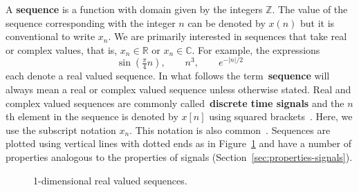 \documentclass[11pt,a4paper]{book}
\theoremstyle{plain}
\numberwithin{equation}{section}
\newcommand{\reals}{{\mathbb R}}
\newcommand{\ints}{{\mathbb Z}}
\newcommand{\complex}{{\mathbb C}}
\newcommand{\term}{\textbf}
\newcommand{\sabs}[1]{\vert #1 \vert}
\begin{document}
A \term{sequence} is a function with domain given by the integers $\ints$.  The value of the sequence corresponding with the integer $n$ can be denoted by $x(n)$ but it is conventional to write $x_n$.  We are primarily interested in sequences that take real or complex values, that is, $x_n \in \reals$ or $x_n \in \complex$.  For example,  the expressions
\[
\sin( \tfrac{\pi}{4} n), \qquad n^3, \qquad e^{-\sabs{n}/2}
\]
each denote a real valued sequence.  In what follows the term~\term{sequence} will always mean a real or complex valued sequence unless otherwise stated.  Real and complex valued sequences are commonly called~\term{discrete time signals} and the $n$th element in the sequence is denoted by $x[n]$ using squared brackets~\citep{Oppenheiim_sigs_sys_1996}.  Here, we use the subscript notation $x_n$. This notation is also common~\citep{vetterli_fund_sig_proc,Rudin_real_and_complex_analysis}.
Sequences are plotted using vertical lines with dotted ends as in Figure~\ref{fig:realvaluedsequence} and have a number of properties analogous to the properties of signals (Section~\ref{sec:properties-signals}).

\begin{figure}[tp]
\centering
\def\minn{-4}
\def\maxn{4}
\def\scalex{0.6}
 \;\;
\caption{1-dimensional real valued sequences.} \label{fig:realvaluedsequence}
\end{figure}
\end{document}
